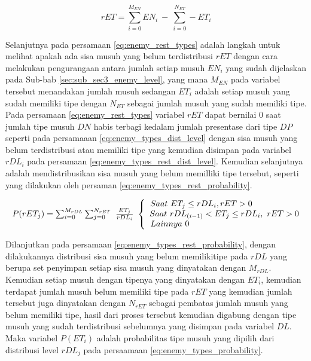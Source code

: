 \begin{equation}\label{eq:enemy_rest_types}
rET = \sum_{i = 0}^{M_{EN}} EN_{i}\ -\ \sum_{i = 0}^{N_{ET}} - ET_{i}
\end{equation}

Selanjutnya pada persamaan \ref{eq:enemy_rest_types} adalah langkah untuk melihat apakah ada sisa musuh yang belum terdistribusi $rET$ dengan cara melakukan pengurangaan antara jumlah setiap musuh $EN_{i}$ yang sudah dijelaskan pada Sub-bab \ref{sec:sub_sec3_enemy_level}, yang mana $M_{EN}$ pada variabel tersebut menandakan jumlah musuh sedangan $ET_{i}$ adalah setiap musuh yang sudah memiliki tipe dengan $N_{ET}$ sebagai jumlah musuh yang sudah memiliki tipe. Pada persamaan \ref{eq:enemy_rest_types} variabel $rET$ dapat bernilai 0 saat jumlah tipe musuh $DN$ habis terbagi kedalam jumlah presentase dari tipe $DP$ seperti pada persamaaan \ref{eq:enemy_types_dist_level} dengan sisa musuh yang belum terdistribusi atau memiliki tipe yang kemudian disimpan pada variabel $rDL_{i}$ pada persamaan \ref{eq:enemy_types_rest_dist_level}. Kemudian selanjutnya adalah mendistribusikan sisa musuh yang belum memilliki tipe tersebut, seperti yang dilakukan oleh persaman \ref{eq:enemy_types_rest_probability}.
\vspace{1ex}

\begin{equation}\label{eq:enemy_types_rest_probability}
\begin{split}
\resizebox{\columnwidth}{!}{%
	$P(rET_{j}) = \sum_{i = 0}^{M_{rDL}} \sum_{j = 0}^{N_{rET}}\ \frac{ET_{j}}{rDL_{i}}\
	\left\{\begin{matrix}
	\hspace{-5.0em} Saat\ ET_{j} \leq rDL_{i}, rET > 0\\
	\hspace{0.5em} Saat\ rDL_{(i-1)} < ET_{j} \leq rDL_{i},\ rET > 0\\
	\hspace{-12.5em} Lainnya\ 0
	\end{matrix}\right.$%
}
\end{split}
\end{equation}

Dilanjutkan pada persamaan \ref{eq:enemy_types_rest_probability}, dengan dilakukannya distribusi sisa musuh yang belum memilikitipe pada $rDL$ yang berupa set penyimpan setiap sisa musuh yang dinyatakan dengan $M_{rDL}$. Kemudian setiap musuh dengan tipenya yang dinyatakan dengan $ET_{i}$, kemudian terdapat jumlah musuh belum memiliki tipe pada $rET$ yang kemudian jumlah tersebut juga dinyatakan dengan $N_{rET}$ sebagai pembatas jumlah musuh yang belum memiliki tipe, hasil dari proses tersebut kemudian digabung dengan tipe musuh yang sudah terdistribusi sebelumnya yang disimpan pada variabel $DL$. Maka variabel $P(ET_{i})$ adalah probabilitas tipe musuh yang dipilih dari distribusi level $rDL_{j}$ pada persaamaan \ref{eq:enemy_types_probability}.
\vspace{1ex}

